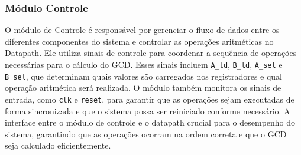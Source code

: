 \documentclass[a4paper,11pt]{article} %
\begin{document}
\subsubsection{Módulo Controle}

O módulo de Controle é responsável por gerenciar o fluxo de dados entre 
os diferentes componentes do sistema e 
controlar as operações aritméticas no Datapath. 
Ele utiliza sinais de controle para coordenar a sequência de operações 
necessárias para o cálculo do GCD. 
Esses sinais incluem \texttt{A\_ld}, \texttt{B\_ld}, \texttt{A\_sel} e \texttt{B\_sel},  
que determinam quais valores são carregados nos registradores 
e qual operação aritmética será realizada. 
O módulo também monitora os sinais de entrada, 
como \texttt{clk} e \texttt{reset}, para garantir que as operações sejam 
executadas de forma sincronizada e que o sistema 
possa ser reiniciado conforme necessário. 
A interface entre o módulo de controle e o datapath 
crucial para o desempenho do sistema, 
garantindo que as operações ocorram na ordem correta 
e que o GCD seja calculado eficientemente.







\end{document}
